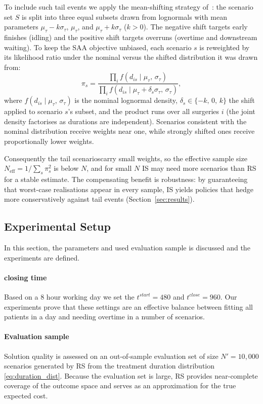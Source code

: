To include such tail events we apply the mean-shifting strategy
of~\cite{aditri-2026}: the scenario set $S$ is split into three equal subsets
drawn from lognormals with mean parameters $\mu_\tau - k\sigma_\tau$, $\mu_\tau$,
and $\mu_\tau + k\sigma_\tau$ ($k > 0$). The negative shift targets early
finishes (idling) and the positive shift targets overruns (overtime and
downstream waiting). To keep the SAA objective unbiased, each scenario $s$ is
reweighted by its likelihood ratio under the nominal versus the shifted
distribution it was drawn from:
%
\begin{equation}
  \pi_s
    = \frac{\prod_{i} f(d_{is} \mid \mu_\tau,\, \sigma_\tau)}
           {\prod_{i} f(d_{is} \mid \mu_\tau + \delta_s \sigma_\tau,\, \sigma_\tau)},
  \label{eq:is_weights}
\end{equation}
%
where $f(d_{is} \mid \mu_\tau,\, \sigma_\tau)$ is the nominal lognormal density,
$\delta_s \in \{-k,\, 0,\, k\}$ the shift applied to scenario $s$'s subset, and
the product runs over all surgeries $i$ (the joint density factorises as
durations are independent). Scenarios consistent with the nominal distribution
receive weights near one, while strongly shifted ones receive proportionally
lower weights.

Consequently the tail scenarioscarry small weights, so the effective sample size
$N_{\text{eff}} = 1 / \sum_s \pi_s^2$ is below $N$, and for small $N$ IS may need
more scenarios than RS for a stable estimate. The compensating benefit is
robustness: by guaranteeing that worst-case realisations appear in every sample,
IS yields policies that hedge more conservatively against tail events
(Section~\ref{sec:results}).

\subsection{Experimental Setup}
\label{sec:exp_setup}
In this section, the parameters and used evaluation sample is discussed and the experiments are defined.
\paragraph{closing time}
Based on a 8 hour working day we set the $t^{start} = 480$ and $t^{close} = 960$. Our experiments prove that these settings are an effective balance between fitting all patients in a day and needing overtime in a number of scenarios.
\paragraph{Evaluation sample}
Solution quality is assessed on an out-of-sample evaluation set of size
$N' = 10{,}000$ scenarios generated by RS from the treatment duration distribution
\eqref{eq:duration_dist}. Because the evaluation set is large, RS provides
near-complete coverage of the outcome space and serves as an approximation for the true
expected cost.

